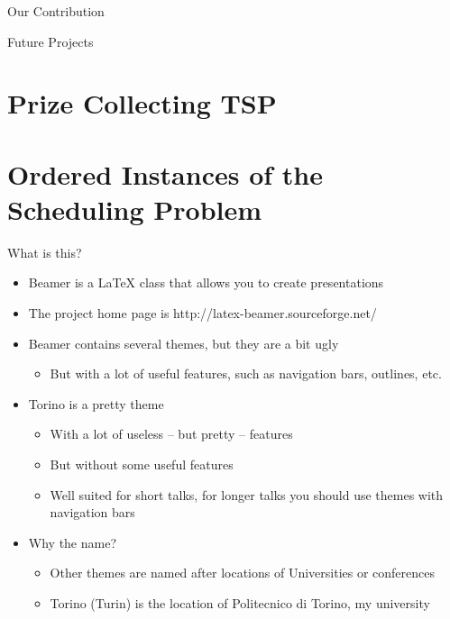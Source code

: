 \begin{frame}[t]{Our Contribution}

\end{frame}

\begin{frame}[t]{Future Projects}
\end{frame}

\section{Prize Collecting TSP}
\frame{\insertsection}

\section{Ordered Instances of the Scheduling Problem}
\frame{\insertsection}



\begin{frame}[t]{What is this?}
\begin{itemize}
\item Beamer is a \LaTeX{} class that allows you to create presentations
\item The project home page is http://latex-beamer.sourceforge.net/
\item Beamer contains several themes, but they are a bit ugly
  \begin{itemize}
  \item But with a lot of useful features, such as navigation bars, outlines,
        etc.
  \end{itemize}
\item Torino is a pretty theme
  \begin{itemize}
  \item With a lot of useless -- but pretty -- features
  \item But without some useful features
  \item Well suited for short talks, for longer talks you should use themes
        with navigation bars
  \end{itemize}
\item Why the name?
  \begin{itemize}
  \item Other themes are named after locations of Universities or conferences
  \item Torino (Turin) is the location of Politecnico di Torino, my university
  \end{itemize}
\end{itemize}
\end{frame}

